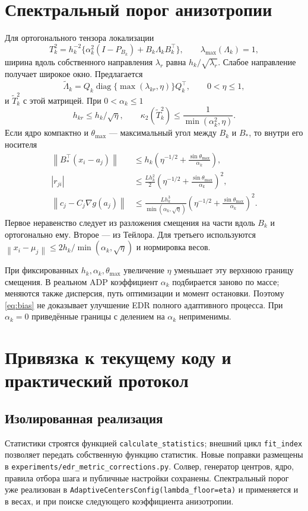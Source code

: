 \documentclass[11pt,a4paper]{article}
\newcommand{\norm}[1]{\left\lVert#1\right\rVert}
\newcommand{\code}[1]{\nolinkurl{#1}}
\begin{document}
\section{Спектральный порог анизотропии}
Для ортогонального тензора локализации
\[
 T_k^2=h_k^{-2}\{\alpha_k^2(I-P_{B_k})+B_k\Lambda_kB_k^\top\},
 \qquad \lambda_{\max}(\Lambda_k)=1,
\]
ширина вдоль собственного направления $\lambda_r$ равна
$h_k/\sqrt{\lambda_r}$. Слабое направление получает широкое окно.
Предлагается
\begin{equation}\label{eq:floor}
 \widetilde\Lambda_k=Q_k\operatorname{diag}\{\max(\lambda_{kr},\eta)\}Q_k^\top,
 \qquad 0<\eta\le1,
\end{equation}
и $\widetilde T_k^2$ с этой матрицей. При $0<\alpha_k\le1$
\begin{equation}\label{eq:condition}
 h_{kr}\le h_k/\sqrt\eta,\qquad
 \kappa_2(\widetilde T_k^2)\le\frac1{\min(\alpha_k^2,\eta)}.
\end{equation}
Если ядро компактно и $\theta_{\max}$ --- максимальный угол
между $B_k$ и $B_*$, то внутри его носителя
\begin{align}
 \norm{B_*^\top(x_i-a_j)}
 &\le h_k\left(\eta^{-1/2}+\frac{\sin\theta_{\max}}{\alpha_k}\right),\label{eq:radius}\\
 |r_{ji}|&\le\frac{Lh_k^2}{2}
 \left(\eta^{-1/2}+\frac{\sin\theta_{\max}}{\alpha_k}\right)^2,\nonumber\\
 \norm{c_j-C_j\nabla g(a_j)}
 &\le\frac{Lh_k^3}{\min(\alpha_k,\sqrt\eta)}
 \left(\eta^{-1/2}+\frac{\sin\theta_{\max}}{\alpha_k}\right)^2.\label{eq:bias}
\end{align}
Первое неравенство следует из разложения смещения на части вдоль
$B_k$ и ортогонально ему. Второе --- из Тейлора. Для третьего
используются $\norm{x_i-\mu_j}\le2h_k/\min(\alpha_k,\sqrt\eta)$
и нормировка весов.

При фиксированных $h_k,\alpha_k,\theta_{\max}$ увеличение $\eta$
уменьшает эту верхнюю границу смещения. В реальном ADP коэффициент
$\alpha_k$ подбирается заново по массе; меняются также дисперсия,
путь оптимизации и момент остановки. Поэтому \eqref{eq:bias}
не доказывает улучшение EDR полного адаптивного процесса.
При $\alpha_k=0$ приведённые границы с делением на $\alpha_k$
неприменимы.

\section{Привязка к текущему коду и практический протокол}
\subsection{Изолированная реализация}
Статистики строятся функцией \code{calculate_statistics}; внешний цикл
\code{fit_index} позволяет передать собственную функцию статистик.
Новые поправки размещены в \code{experiments/edr_metric_corrections.py}.
Солвер, генератор центров, ядро, правила отбора шага и публичные настройки
сохранены. Спектральный порог уже реализован в
\code{AdaptiveCentersConfig(lambda_floor=eta)} и применяется и в весах,
и при поиске следующего коэффициента анизотропии.
\end{document}
